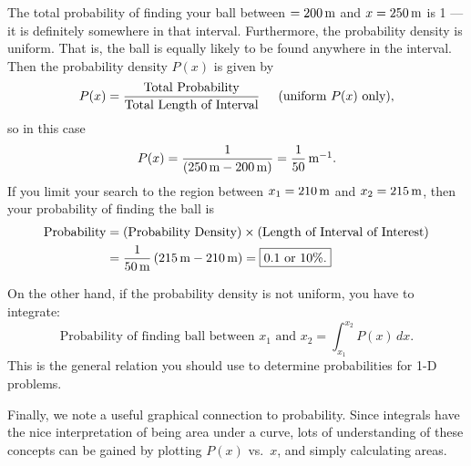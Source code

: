 The total probability of finding your ball between $ =200\,\mbox{m}$ 
and $x = 250\,\mbox{m}$ is 1 --- it is definitely
somewhere in that interval.  Furthermore, the probability density is
uniform.  That is, the ball is equally likely to be found anywhere in
the interval.  Then the probability density $P(x)$ is given by
\begin{equation}
P(x) = \frac{\text{Total Probability}}{\text{Total Length of Interval}}
\hspace{0.2in}\text{(uniform $P(x)$ only)},
\end{equation}
so in this case
\begin{equation}
P(x) = \frac{1}{(250\,\mbox{m}-200\,\mbox{m})} =
\frac{1}{50}\,\mbox{m$^{-1}$}.
\end{equation}
If you limit your search to the region between
$x_1 = 210\,\mbox{m}$ and $x_2 = 215\,\mbox{m}$, then your
probability of finding the ball is
\begin{align}
\text{Probability} &= (\text{Probability Density})\times
(\text{Length of Interval of Interest}) \nonumber \\ 
 &= \frac{1}{50\units{m}} \left(215\units{m}-210\units{m}\right) 
 = \boxed{0.1 \text{ or 10\%}.}  %
\label{eq:prob_density_uniform}
\end{align}

On the other hand, if the probability density is not uniform, you have
to integrate: %
\begin{equation}
\text{Probability of finding ball between $x_1$ and $x_2$} 
   = \int_{x_1}^{x_2} P(x)\, dx.
\end{equation}
This is the general relation you should use to determine probabilities
for 1-D problems.

Finally, we note a useful graphical connection to probability.  Since
integrals have the nice interpretation of being area under a curve,
lots of understanding of these concepts can be gained by plotting
$P(x)$ vs.\ $x$, and simply calculating areas.
\newpage

